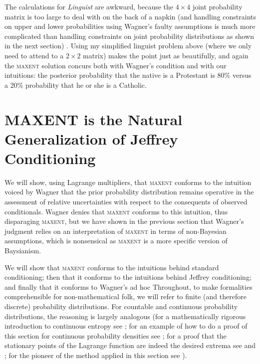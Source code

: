 \documentclass[11pt]{article}
\begin{document}
The calculations for \emph{Linguist} are awkward, because the
$4\times{}4$ joint probability matrix is too large to deal with on the
back of a napkin (and handling constraints on upper and lower
probabilities using Wagner's faulty assumptions is much more
complicated than handling constraints on joint probability
distributions as shown in the next section) . Using my simplified
linguist problem above (where we only need to attend to a $2\times{}2$
matrix) makes the point just as beautifully, and again the
\textsc{maxent} solution concurs both with Wagner's condition and with
our intuitions: the posterior probability that the native is a
Protestant is 80\% versus a 20\% probability that he or she is a
Catholic.

\section{MAXENT is the Natural Generalization of Jeffrey Conditioning}
\label{maxjeff}

We will show, using Lagrange multipliers, that \textsc{maxent}
conforms to the intuition voiced by Wagner that the prior probability
distribution remains operative in the assessment of relative
uncertainties with respect to the consequents of observed
conditionals. Wagner denies that \textsc{maxent} conforms to this
intuition, thus disparaging \textsc{maxent}, but we have shown in the
previous section that Wagner's judgment relies on an interpretation of
\textsc{maxent} in terms of non-Bayesian assumptions, which is
nonsensical as \textsc{maxent} is a more specific version of
Baysianism.

We will show that \textsc{maxent} conforms to the intuitions behind
standard conditioning; then that it conforms to the intuitions behind
Jeffrey conditioning; and finally that it conforms to Wagner's ad hoc
 Throughout, to
make formalities comprehensible for non-mathematical folk, we will
refer to finite (and therefore discrete) probability distributions.
For countable and continuous probability distributions, the reasoning
is largely analogous (for a mathematically rigorous introduction to
continuous entropy see ; for an example of
how to do a proof of this section for continuous probability densities
see ; for a proof that the stationary
points of the Lagrange function are indeed the desired extrema see
 and ; for the
pioneer of the method applied in this section see
).
\end{document}
